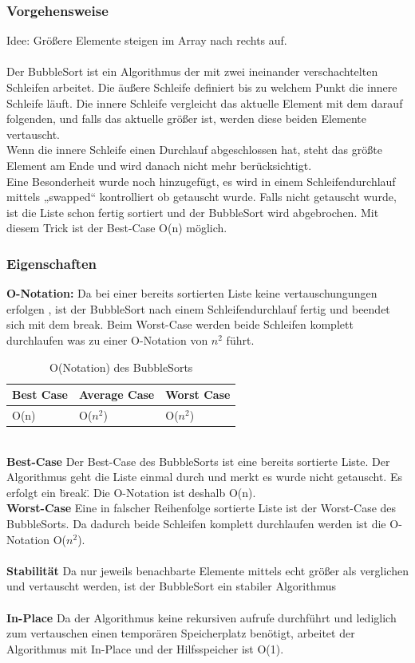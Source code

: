 \documentclass{article}
\begin{document}
\subsubsection{Vorgehensweise}
Idee: Größere Elemente steigen im Array nach rechts auf.\\ \\
Der BubbleSort ist ein Algorithmus der mit zwei ineinander verschachtelten Schleifen arbeitet. Die äußere Schleife definiert bis zu welchem Punkt die innere Schleife läuft. Die innere Schleife vergleicht das aktuelle Element mit dem darauf folgenden, und falls das aktuelle größer ist, werden diese beiden Elemente vertauscht.\\
Wenn die innere Schleife einen Durchlauf abgeschlossen hat, steht das größte Element am Ende und wird danach nicht mehr berücksichtigt. \\
Eine Besonderheit wurde noch hinzugefügt, es wird in einem Schleifendurchlauf mittels „swapped“ kontrolliert ob getauscht wurde. Falls nicht getauscht wurde, ist die Liste schon fertig sortiert und der BubbleSort wird abgebrochen. Mit diesem Trick ist der Best-Case O(n) möglich. 


\subsubsection{Eigenschaften}
\textbf{O-Notation:} Da bei einer bereits sortierten Liste keine vertauschungungen erfolgen , ist der BubbleSort nach einem Schleifendurchlauf fertig und beendet sich mit dem break. Beim Worst-Case werden beide Schleifen komplett durchlaufen was zu einer O-Notation von $n^{2}$ führt.
\begin{table}[h]
\centering
\begin{tabular}{lll}
	\hline
	\textbf{Best Case} & \textbf{Average Case} & \textbf{Worst Case} \\
	\hline
	O(n) & O($n^{2}$) & O($n^{2}$) \\
	\hline
\end{tabular}
\caption{O(Notation) des BubbleSorts \cite{India2015Dataset}}
\label{tab:bubbleSort}
\end{table}
\\\textbf{Best-Case} Der Best-Case des BubbleSorts ist eine bereits sortierte Liste. Der Algorithmus geht die Liste einmal durch und merkt es wurde nicht getauscht. Es erfolgt ein \"break\". Die O-Notation ist deshalb O(n).\\
\textbf{Worst-Case} Eine in falscher Reihenfolge sortierte Liste ist der Worst-Case des BubbleSorts. Da dadurch beide Schleifen komplett durchlaufen werden ist die O-Notation O($n^{2}$). \\ \\
\textbf{Stabilität} Da nur jeweils benachbarte Elemente mittels echt größer als verglichen und vertauscht werden, ist der BubbleSort ein stabiler Algorithmus \\ \\
\textbf{In-Place} Da der Algorithmus keine rekursiven aufrufe durchführt und lediglich zum vertauschen einen temporären Speicherplatz benötigt, arbeitet der Algorithmus mit In-Place und der Hilfsspeicher ist O(1). \cite{India2015Dataset}\\
\end{document}
